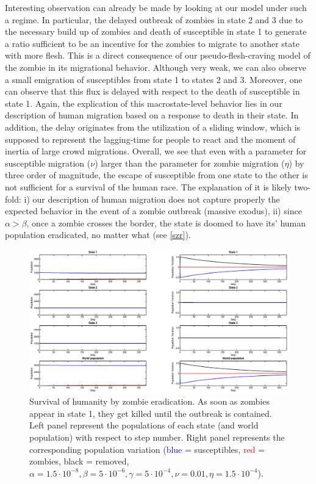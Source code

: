 \documentclass[11pt]{article} %
\begin{document}
Interesting observation can already be made by looking at our model under such a regime. In particular, the delayed outbreak of zombies in state 2 and 3 due to the necessary build up of zombies and death of susceptible in state 1 to generate a ratio sufficient to be an incentive for the zombies to migrate to another state with more flesh. This is a direct consequence of our pseudo-flesh-craving model of the zombie in its migrational behavior. Although very weak, we can also observe a small emigration of susceptibles from state 1 to states 2 and 3. Moreover, one can observe that this flux is delayed with respect to the death of susceptible in state 1. Again, the explication of this macrostate-level behavior lies in our description of human migration based on a response to death in their state. In addition, the delay originates from the utilization of a sliding window, which is supposed to represent the lagging-time for people to react and the moment of inertia of large crowd migrations. Overall, we see that even with a parameter for susceptible migration ($\nu$) larger than the parameter for zombie migration ($\eta$) by three order of magnitude, the escape of susceptible from one state to the other is not sufficient for a survival of the human race. The explanation of it is likely two-fold: i) our description of human migration does not capture properly the expected behavior in the event of a zombie outbreak (massive exodus), ii) since $\alpha>\beta$, once a zombie crosses the border, the state is doomed to have its' human population eradicated, no matter what (see \ref{szr}). 
\begin{figure}[h!]
\centerline{
\includegraphics[scale=0.35]{../images/Matlab_figures/example_zkill.eps}}
\caption{Survival of humanity by zombie eradication. As soon as zombies appear in state 1, they get killed until the outbreak is contained. Left panel represent the populations of each state (and world population) with respect to step number. Right panel represents the corresponding population variation (\textcolor{blue}{blue} = susceptibles, \textcolor{red}{red} = zombies, black = removed, $\alpha=1.5\cdot10^{-8}, \beta=5\cdot10^{-6}, \gamma=5\cdot10^{-4}, \nu=0.01, \eta=1.5\cdot10^{-4}$).
\label{skill} }
\end{figure}
\end{document}

